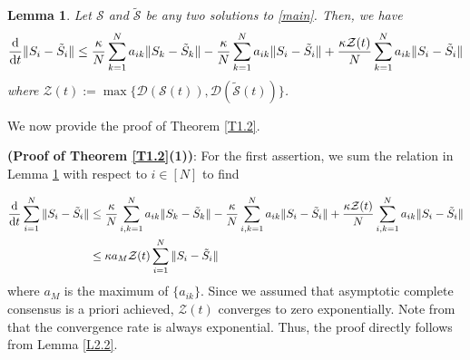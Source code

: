 \documentclass[11pt,reqno]{amsart}
\numberwithin{figure}{section}
\newcommand{\kp}{\kappa}
\newcommand{\dd}{  {\textup{d}} }
\newcommand{\dt} {    {  \textup{d}t   }    }
\newtheorem{lemma}{Lemma}[section]
\begin{document}
\begin{lemma} \label{L4.1}
Let $\mathcal S$ and $\tilde{\mathcal S}$ be any two solutions to \eqref{main}. Then, we have
\[
\frac\dd\dt \|S_i - \tilde S_i\| \leq \frac{\kp}{N}\sum_{k=1}^N  a_{ik} \|S_k - \tilde S_k\| - \frac{\kp}{N} \sum_{k=1}^N a_{ik} \|S_i - \tilde S_i\| + \frac{\kp\mathcal Z(t)}{N} \sum_{k=1}^N a_{ik} \|S_i -\tilde S_i\|
\]
where $\mathcal Z(t) := \max\{\mathcal D(\mathcal S(t)),\mathcal D(\tilde{\mathcal S}(t)) \}$. 
\end{lemma}



We now provide the proof of Theorem \ref{T1.2}. 

\vspace{0.5cm}


\noindent \textbf{(Proof of Theorem \ref{T1.2}(1))}:  For the first assertion, we sum the relation in Lemma \ref{L4.1} with respect to $i\in [N]$ to find

\begin{align*}
\frac\dd\dt \sum_{i=1}^N \|S_i - \tilde S_i\| &\leq \frac{\kp}{N} \sum_{i,k=1}^N a_{ik} \|S_k - \tilde S_k\| - \frac{\kp }{N} \sum_{i,k=1}^N a_{ik} \|S_i - \tilde S_i\| + \frac{\kp \mathcal Z(t)}{N} \sum_{i,k=1}^N a_{ik} \|S_i - \tilde S_i\| \\
& \leq \kp a_M \mathcal Z(t) \sum_{i=1}^N \|S_i -\tilde S_i\| 
\end{align*}
where $a_M$ is the maximum of $\{a_{ik}\}$. Since we assumed that asymptotic complete consensus is a priori achieved, $\mathcal Z(t)$ converges to zero exponentially. Note from \cite{HKK22} that the convergence rate is always exponential.  Thus, the proof directly follows from Lemma \ref{L2.2}. 


\vspace{0.5cm}
\end{document}
